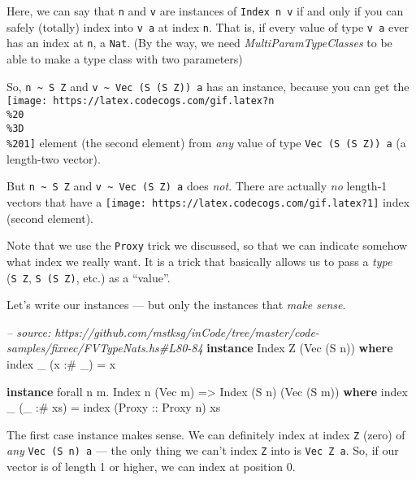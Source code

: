 \documentclass[]{article}
\newenvironment{Shaded}{}{}
\newcommand{\KeywordTok}[1]{\textcolor[rgb]{0.00,0.44,0.13}{\textbf{#1}}}
\newcommand{\DataTypeTok}[1]{\textcolor[rgb]{0.56,0.13,0.00}{#1}}
\newcommand{\CommentTok}[1]{\textcolor[rgb]{0.38,0.63,0.69}{\textit{#1}}}
\newcommand{\OtherTok}[1]{\textcolor[rgb]{0.00,0.44,0.13}{#1}}
\newcommand{\FunctionTok}[1]{\textcolor[rgb]{0.02,0.16,0.49}{#1}}
\newcommand{\NormalTok}[1]{#1}
\begin{document}
Here, we can say that \texttt{n} and \texttt{v} are instances of
\texttt{Index\ n\ v} if and only if you can safely (totally) index into
\texttt{v\ a} at index \texttt{n}. That is, if every value of type \texttt{v\ a}
ever has an index at \texttt{n}, a \texttt{Nat}. (By the way, we need
\emph{MultiParamTypeClasses} to be able to make a type class with two
parameters)

So, \texttt{n\ \textasciitilde{}\ S\ Z} and
\texttt{v\ \textasciitilde{}\ Vec\ (S\ (S\ Z))\ a} has an instance, because you
can get the
\texttt{[image: https://latex.codecogs.com/gif.latex?n\\\%20\\\%3D\\\%201]} element
(the second element) from \emph{any} value of type \texttt{Vec\ (S\ (S\ Z))\ a}
(a length-two vector).

But \texttt{n\ \textasciitilde{}\ S\ Z} and
\texttt{v\ \textasciitilde{}\ Vec\ (S\ Z)\ a} does \emph{not}. There are
actually \emph{no} length-1 vectors that have a
\texttt{[image: https://latex.codecogs.com/gif.latex?1]} index (second element).

Note that we use the \texttt{Proxy} trick we discussed, so that we can indicate
somehow what index we really want. It is a trick that basically allows us to
pass a \emph{type} (\texttt{S\ Z}, \texttt{S\ (S\ Z)}, etc.) as a ``value''.

Let's write our instances --- but only the instances that \emph{make sense}.

\begin{Shaded}
\begin{Highlighting}[]
\CommentTok{-- source: https://github.com/mstksg/inCode/tree/master/code-samples/fixvec/FVTypeNats.hs#L80-84}
\KeywordTok{instance} \DataTypeTok{Index} \DataTypeTok{Z}\NormalTok{ (}\DataTypeTok{Vec}\NormalTok{ (}\DataTypeTok{S}\NormalTok{ n)) }\KeywordTok{where}
\NormalTok{    index _ (x }\FunctionTok{:#}\NormalTok{ _) }\FunctionTok{=}\NormalTok{ x}

\KeywordTok{instance}\NormalTok{ forall n m}\FunctionTok{.} \DataTypeTok{Index}\NormalTok{ n (}\DataTypeTok{Vec}\NormalTok{ m) }\OtherTok{=>} \DataTypeTok{Index}\NormalTok{ (}\DataTypeTok{S}\NormalTok{ n) (}\DataTypeTok{Vec}\NormalTok{ (}\DataTypeTok{S}\NormalTok{ m)) }\KeywordTok{where}
\NormalTok{    index _ (_ }\FunctionTok{:#}\NormalTok{ xs) }\FunctionTok{=}\NormalTok{ index (}\DataTypeTok{Proxy}\OtherTok{ ::} \DataTypeTok{Proxy}\NormalTok{ n) xs}
\end{Highlighting}
\end{Shaded}

The first case instance makes sense. We can definitely index at index \texttt{Z}
(zero) of \emph{any} \texttt{Vec\ (S\ n)\ a} --- the only thing we can't index
\texttt{Z} into is \texttt{Vec\ Z\ a}. So, if our vector is of length 1 or
higher, we can index at position 0.
\end{document}
